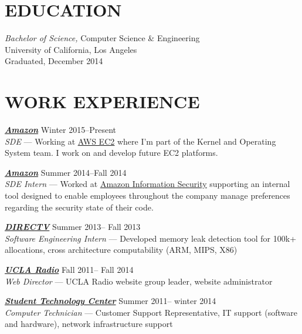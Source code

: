 \documentclass[line,letterpaper]{resume}
\begin{document}
\address{\href{www.aclander.com}{Personal website --- www.aclander.com}}
\address{\href{mailto:nathan.aclander@ucla.edu}{nathan.aclander@ucla.edu} --- (949) 436-8945}


\begin{resume}
    \vspace{-24pt}
    \section{\uppercase{Education}} {\sl Bachelor of Science,} \/
    Computer Science \& Engineering \\
    University of California, Los Angeles\\
    Graduated, December 2014 \\

    \vspace{-16pt}

	\section{\uppercase{Work Experience}}

	{\sl\textbf{\href{www.amazon.com}{Amazon}}} \hfill Winter 2015--Present\\
    \emph{SDE} --- Working at \underline{\href{http://aws.amazon.com/ec2}
	{AWS EC2}} where I'm part of the Kernel and Operating System team. I work on and develop
	future EC2 platforms.

	{\sl\textbf{\href{www.amazon.com}{Amazon}}} \hfill Summer 2014--Fall 2014\\
    \emph{SDE Intern} --- Worked at \underline{\href{http://security.amazon-jobs.com/index.html}
    {Amazon Information Security}} supporting an internal tool designed to
	enable employees throughout the company manage preferences regarding the
	security state of their code.

    {\sl\textbf{\href{www.directv.com}{DIRECTV}}} \hfill Summer 2013-- Fall 2013\\
    \emph{Software Engineering Intern}
    ---  Developed memory leak detection tool for 100k+ allocations,
	cross architecture computability (ARM, MIPS, X86)

    {\sl\textbf{\href{www.uclaradio.com}{UCLA Radio}}} \hfill Fall 2011-- Fall 2014\\
    \emph{Web Director} --- UCLA Radio website group leader, website administrator

    {\sl\textbf{\href{https://housing.ucla.edu/residence-hall-computing}
	{Student Technology Center}}} \hfill Summer 2011-- winter 2014\\
    \emph{Computer Technician} --- Customer Support Representative,
IT support (software and hardware), network infrastructure support
    \vspace{-6pt}


\end{resume}
\end{document}
